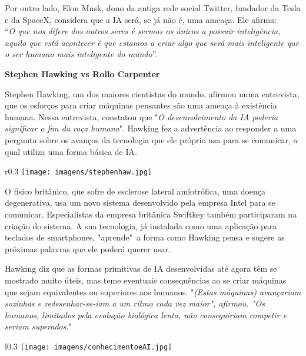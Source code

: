\documentclass{report}
\begin{document}
Por outro lado, Elon Musk, dono da antiga rede social Twitter, fundador da Tesla e da SpaceX, considera que a \ac{IA} será, se já não é, uma ameaça. Ele afirma: \\“\textit{O que nos difere dos outros seres é sermos os únicos a possuir inteligência, aquilo que está acontecer é que estamos a criar algo que será mais inteligente que o ser humano mais inteligente do mundo}”.

\vspace{100pt}

\begin{center}
    \LARGE{\textbf{Stephen Hawking vs Rollo Carpenter}}    
\end{center}

\vspace{15pt}

Stephen Hawking, um dos maiores cientistas do mundo, afirmou numa entrevista, que os esforços para criar máquinas pensantes são uma ameaça à existência humana. Nessa entrevista, constatou que "\textit{O desenvolvimento da \ac{IA} poderia significar o fim da raça humana}". Hawking fez a advertência ao responder a uma pergunta sobre os avanços da tecnologia que ele próprio usa para se comunicar, a qual utiliza uma forma básica de \ac{IA}.

\begin{wrapfigure}{r}{0.3\textwidth} 
    \centering
    \texttt{[image: imagens/stephenhaw.jpg]}
    \footnotesize{\caption{}}
    \label{fig:hawking}
\end{wrapfigure}
O físico britânico, que sofre de esclerose lateral amiotrófica, uma doença degenerativa, usa um novo sistema desenvolvido pela empresa Intel para se comunicar. Especialistas da empresa britânica Swiftkey também participaram na criação do sistema. A sua tecnologia, já instalada como uma aplicação para teclados de smartphones, "aprende"\ a forma como Hawking pensa e sugere as próximas palavras que ele poderá querer usar.
\vspace{5pt}

Hawking diz que as formas primitivas de \ac{IA} desenvolvidas até agora têm se mostrado muito úteis, mas teme eventuais consequências ao se criar máquinas que sejam equivalentes ou superiores aos humanos.
"\textit{(Estas máquinas) avançariam sozinhas e redesenhar-se-iam a um ritmo cada vez maior", afirmou. "Os humanos, limitados pela evolução biológica lenta, não conseguiriam competir e seriam superados.}"

\begin{wrapfigure}{l}{0.3\textwidth} 
    \centering
    \texttt{[image: imagens/conhecimentoeAI.jpg]}
    \footnotesize{\caption{}}
    \label{fig:conhecimentoAI}
\end{wrapfigure}
\end{document}

